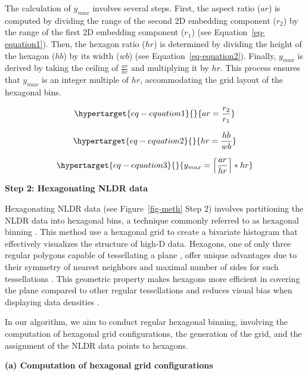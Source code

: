\documentclass[
  12pt]{article}
\begin{document}
The calculation of \(y_{max}\) involves several steps. First, the aspect
ratio (\(ar\)) is computed by dividing the range of the second 2D
embedding component (\(r_2\)) by the range of the first 2D embedding
component (\(r_1\)) (see Equation~\ref{eq-equation1}). Then, the hexagon
ratio (\(hr\)) is determined by dividing the height of the hexagon
(\(hb\)) by its width (\(wb\)) (see Equation~\ref{eq-equation2}).
Finally, \(y_{max}\) is derived by taking the ceiling of
\(\frac{ar}{hr}\) and multiplying it by \(hr\). This process ensures
that \(y_{max}\) is an integer multiple of \(hr\), accommodating the
grid layout of the hexagonal bins.

\begin{equation}\protect\hypertarget{eq-equation1}{}{
 ar = \frac{r_2}{r_1}
}\label{eq-equation1}\end{equation}

\begin{equation}\protect\hypertarget{eq-equation2}{}{
 hr = \frac{hb}{wb}
}\label{eq-equation2}\end{equation}

\begin{equation}\protect\hypertarget{eq-equation3}{}{
 y_{max} = \left\lceil\frac{ar}{hr}\right\rceil * hr
}\label{eq-equation3}\end{equation}

\textbf{Step 2: Hexagonating NLDR data}

Hexagonating NLDR data (see Figure~\ref{fig-meth} Step 2) involves
partitioning the NLDR data into hexagonal bins, a technique commonly
referred to as hexagonal binning \citep[\citet{article66}]{Carr1987}.
This method use a hexagonal grid to create a bivariate histogram that
effectively visualizes the structure of high-D data. Hexagons, one of
only three regular polygons capable of tessellating a plane
\citep{Carr2013}, offer unique advantages due to their symmetry of
nearest neighbors and maximal number of sides for such tessellations
\citep{Dan2023}. This geometric property makes hexagons more efficient
in covering the plane compared to other regular tessellations and
reduces visual bias when displaying data densities \citep{Dan2023}.

In our algorithm, we aim to conduct regular hexagonal binning, involving
the computation of hexagonal grid configurations, the generation of the
grid, and the assignment of the NLDR data points to hexagons.

\textbf{(a) Computation of hexagonal grid configurations}
\end{document}
